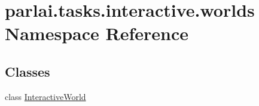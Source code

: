 \hypertarget{namespaceparlai_1_1tasks_1_1interactive_1_1worlds}{}\section{parlai.\+tasks.\+interactive.\+worlds Namespace Reference}
\label{namespaceparlai_1_1tasks_1_1interactive_1_1worlds}
\subsection*{Classes}
\begin{DoxyCompactItemize}
\item 
class \hyperlink{classparlai_1_1tasks_1_1interactive_1_1worlds_1_1InteractiveWorld}{Interactive\+World}
\end{DoxyCompactItemize}
